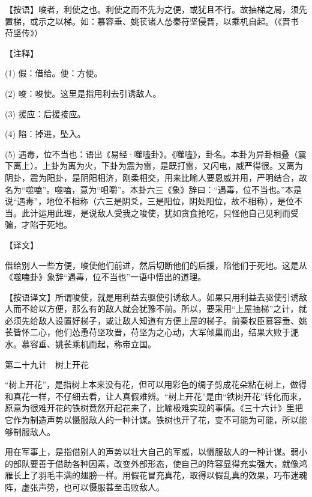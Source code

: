 \documentclass[12pt,UTF8]{ctexbook}
\begin{document}
【按语】唆者，利使之也。利使之而不先为之便，或犹且不行。故抽梯之局，须先置梯，或示之以梯。如：慕容垂、姚苌诸人怂秦苻坚侵晋，以乘机自起。（《晋书·苻坚传》）





【注释】


(1) 假：借给。便：方便。

(2) 唆：唆使。这里是指用利去引诱敌人。

(3) 援应：后援接应。

(4) 陷：掉进，坠入。

(5) 遇毒，位不当也：语出《易经·噬嗑卦》。《噬嗑》，卦名。本卦为异卦相叠（震下离上）。上卦为离为火，下卦为震为雷，是既打雷，又闪电，威严得很。又离为阴卦，震为阳卦，是阴阳相济，刚柔相交，用来比喻人要恩威并用，严明结合，故名为“噬嗑”。噬嗑，意为“咀嚼”。本卦六三《象》辞曰：“遇毒，位不当也。”本是说“遇毒”，地位不相称（六三是阴爻，三是阳位，阴处阳位，故不相称），是位不当。此计运用此理，是说敌人受我之唆使，犹如贪食抢吃，只怪他自己见利而受骗，才陷于死地。





【译文】


借给别人一些方便，唆使他们前进，然后切断他们的后援，陷他们于死地。这是从《噬嗑卦》象辞“遇毒，位不当也”一语中悟出的道理。

【按语译文】所谓唆使，就是用利益去驱使引诱敌人。如果只用利益去驱使引诱敌人而不给以方便，那么有的敌人就会犹豫不前。所以，要采用“上屋抽梯”之计，就必须先给敌人设置好梯子，或让敌人知道有方便上屋的梯子。前秦权臣慕容垂、姚苌皆怀二心，他们怂恿苻坚攻晋，苻坚为之心动，大军倾巢而出，结果大败于淝水。慕容垂、姚苌乘机而起，称帝立国。





第二十九计　树上开花


“树上开花”，是指树上本来没有花，但可以用彩色的绸子剪成花朵粘在树上，做得和真花一样，不仔细去看，让人真假难辨。“树上开花”是由“铁树开花”转化而来，原意为很难开花的铁树竟然开起花来了，比喻极难实现的事情。《三十六计》里把它作为制造声势以慑服敌人的一种计谋。铁树也开了花，变不可能为可能，所以能够制服敌人。

用在军事上，是指借别人的声势以壮大自己的军威，以慑服敌人的一种计谋。弱小的部队要善于借助各种因素，改变外部形态，使自己的阵容显得充实强大，就像鸿雁长上了羽毛丰满的翅膀一样。用假花冒充真花，取得以假乱真的效果，巧布迷魂阵，虚张声势，也可以慑服甚至击败敌人。
\end{document}
